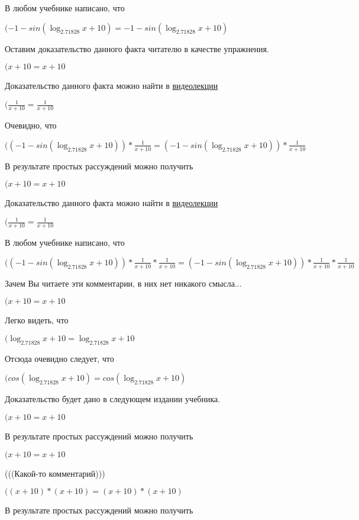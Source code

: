 \documentclass[12pt,a4paper,fleqn]{article}
\theoremstyle{definition}
\begin{document}
В любом учебнике написано, что

$( -1  - sin(\log_{ 2.71828 }{ x  +  10 }) =  -1  - sin(\log_{ 2.71828 }{ x  +  10 })$

Оставим доказательство данного факта читателю в качестве упражнения.

$( x  +  10  =  x  +  10 $

Доказательство данного факта можно найти в \href{https://www.youtube.com/watch?v=dQw4w9WgXcQ}{видеолекции}

$(\frac{ 1 }{ x  +  10 }
 = \frac{ 1 }{ x  +  10 }
$

Очевидно, что

$(( -1  - sin(\log_{ 2.71828 }{ x  +  10 })) * \frac{ 1 }{ x  +  10 }
 = ( -1  - sin(\log_{ 2.71828 }{ x  +  10 })) * \frac{ 1 }{ x  +  10 }
$

В результате простых рассуждений можно получить

$( x  +  10  =  x  +  10 $

Доказательство данного факта можно найти в \href{https://www.youtube.com/watch?v=dQw4w9WgXcQ}{видеолекции}

$(\frac{ 1 }{ x  +  10 }
 = \frac{ 1 }{ x  +  10 }
$

В любом учебнике написано, что

$(( -1  - sin(\log_{ 2.71828 }{ x  +  10 })) * \frac{ 1 }{ x  +  10 }
 * \frac{ 1 }{ x  +  10 }
 = ( -1  - sin(\log_{ 2.71828 }{ x  +  10 })) * \frac{ 1 }{ x  +  10 }
 * \frac{ 1 }{ x  +  10 }
$

Зачем Вы читаете эти комментарии, в них нет никакого смысла...

$( x  +  10  =  x  +  10 $

Легко видеть, что

$(\log_{ 2.71828 }{ x  +  10 } = \log_{ 2.71828 }{ x  +  10 }$

Отсюда очевидно следует, что

$(cos(\log_{ 2.71828 }{ x  +  10 }) = cos(\log_{ 2.71828 }{ x  +  10 })$

Доказательство будет дано в следующем издании учебника.

$( x  +  10  =  x  +  10 $

В результате простых рассуждений можно получить

$( x  +  10  =  x  +  10 $

(((Какой-то комментарий)))

$(( x  +  10 ) * ( x  +  10 ) = ( x  +  10 ) * ( x  +  10 )$

В результате простых рассуждений можно получить
\end{document}
